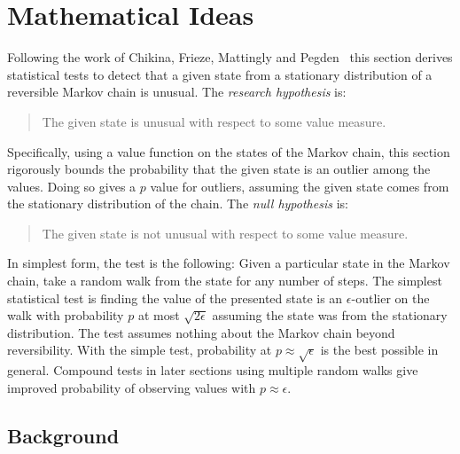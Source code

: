 \documentclass[12pt]{article}
\begin{document}
\section*{Mathematical Ideas}

Following the work of Chikina, Frieze, Mattingly and Pegden~%
\cite{doi:10.1080/2330443X.2020.1806763, Chikina2860, Chikina2019} this
section derives statistical tests to detect that a given state from a
stationary distribution of a reversible Markov chain is unusual.  The
\emph{research hypothesis} is:
\begin{quote}
    The given state is unusual with respect to some value measure.
\end{quote}
Specifically, using a value function on the states of the Markov chain,
this section rigorously bounds the probability that the given state is
an outlier among the values.  Doing so gives a \( p \) value for
outliers, assuming the given state comes from the stationary
distribution of the chain.  The \emph{null hypothesis} is:
\begin{quote}
    The given state is not unusual with respect to some value measure.
\end{quote}

In simplest form, the test is the following:  Given a particular state
in the Markov chain, take a random walk from the state for any number of
steps.  The simplest statistical test is finding the value of the
presented state is an \( \epsilon \)-outlier on the walk with
probability \( p \) at most \( \sqrt{2\epsilon} \) assuming the state
was from the stationary distribution.  The test assumes nothing about
the Markov chain beyond reversibility.  With the simple test,
probability at \( p \approx \sqrt{\epsilon} \) is the best possible in
general.  Compound tests in later sections using multiple random walks
give improved probability of observing values with \( p \approx \epsilon
\).

\subsection*{Background}
\end{document}
